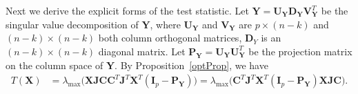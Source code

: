 \documentclass[12pt]{article} %
\newcommand{\bX}{\mathbf{X}}
\newcommand{\bP}{\mathbf{P}}
\newcommand{\bY}{\mathbf{Y}}
\newcommand{\bJ}{\mathbf{J}}
\newcommand{\bC}{\mathbf{C}}
\newcommand{\bI}{\mathbf{I}}
\newcommand{\bU}{\mathbf{U}}
\newcommand{\bD}{\mathbf{D}}
\newcommand{\bV}{\mathbf{V}}
\theoremstyle{definition}
\begin{document}
Next we derive the explicit forms of the test statistic. 
Let $\bY=\bU_{\bY}\bD_{\bY}\bV_{\bY}^T$ be the singular value decomposition of $\bY$, where $\bU_{\bY}$ and $\bV_{\bY}$ are $p\times (n-k)$ and $(n-k)\times(n-k)$ both column orthogonal matrices, $\bD_{Y}$ is an $(n-k)\times (n-k)$ diagonal matrix.
Let $\bP_{\bY}=\bU_{\bY}\bU_{\bY}^T$ be the projection matrix on the column space of $\bY$.
By Proposition~\ref{optProp}, we have
\begin{equation}\label{statisticForm1}
\begin{aligned}
    T(\bX)&=\lambda_{\max}\big(\bX \bJ\bC\bC^T\bJ^T\bX^T (\bI_p-
    \bP_{\bY})
    \big)
    =\lambda_{\max}\big(\bC^T\bJ^T\bX^T (\bI_p-
    \bP_{\bY}
    )\bX\bJ\bC\big).
\end{aligned}
\end{equation}
\end{document}
